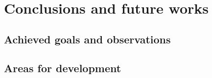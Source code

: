 
\chapter{Conclusions and future works} \label{chap:conclusions}

\section{Achieved goals and observations}

\bt 

\section{Areas for development}

\bt


